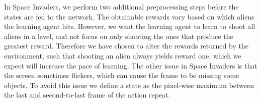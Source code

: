 \documentclass[11pt]{article}
\begin{document}
In Space Invaders, we perform two additional preprocessing steps before
the states are fed to the network.
The obtainable rewards vary based on which aliens the learning agent
hits.
However, we want the learning agent to learn to shoot all aliens in a level,
and not focus on only shooting the ones that produce the greatest reward.
Therefore we have chosen to alter the rewards returned by the environment, such that
shooting an alien always yields reward one, which we expect will increase
the pace of learning.
The other issue in Space Invaders is that the screen sometimes flickers,
which can cause the frame to be missing some objects.
To avoid this issue we define a state as the pixel-wise maximum
between the last and second-to-last frame of the action repeat.
\end{document}
